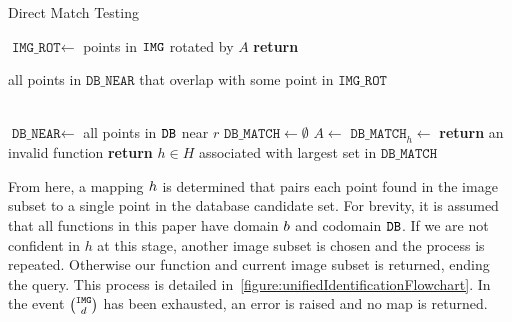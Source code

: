 \begin{algorithm}
	\caption{Direct Match Testing} \label{algorithm:dmt}
	\begin{algorithmic}[1]
		\State $\texttt{IMG\_ROT} \gets$ points in $\texttt{IMG}$ rotated by $A$
		\State \textbf{return} \parbox[t]{0.8\linewidth}{\raggedright all points in $\texttt{DB\_NEAR}$ that overlap with some point in $\texttt{IMG\_ROT}$}
		\EndFunction
		\\
        \State $\texttt{DB\_NEAR} \gets $ all points in $\texttt{DB}$ near $r$
        \State $\texttt{DB\_MATCH} \gets \emptyset$
        \State $A \gets $ 
        \State $\texttt{DB\_MATCH}_h \gets $ 
        \EndFor
        \State \textbf{return} an invalid function %
        \Else
        \State \textbf{return} $h \in H$ associated with largest set in $\texttt{DB\_MATCH}$
        \EndIf
        \EndFunction
	\end{algorithmic}
\end{algorithm}

\newcommand{\smapsto}{\! \mapsto \!}
From here, a mapping $h$ is determined that pairs each point found in the image subset to a single point in the database candidate set.
For brevity, it is assumed that all functions in this paper have domain $b$ and codomain $\texttt{DB}$.
If we are not confident in $h$ at this stage, another image subset is chosen and the process is repeated.
Otherwise our function and current image subset is returned, ending the query.
This process is detailed in~\autoref{figure:unifiedIdentificationFlowchart}.
In the event $\binom{\texttt{IMG}}{d}$ has been exhausted, an error is raised and no map is returned.


